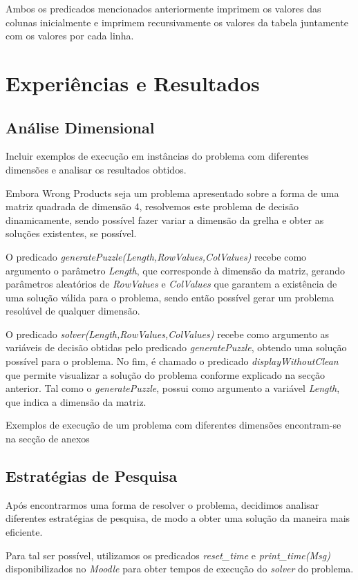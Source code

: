 \documentclass[11pt]{article}
\begin{document}
Ambos os predicados mencionados anteriormente imprimem os valores das colunas inicialmente
e imprimem recursivamente os valores da tabela juntamente com os valores por cada linha.

\section{Experiências e Resultados}

\subsection{Análise Dimensional} Incluir exemplos de execução em instâncias do problema com
diferentes dimensões e analisar os resultados obtidos.

Embora Wrong Products seja um problema apresentado sobre a forma de uma matriz quadrada de dimensão 4, resolvemos este problema de decisão dinamicamente, sendo possível fazer variar a dimensão da grelha e obter as soluções existentes, se possível.

O predicado \emph{generatePuzzle(Length,RowValues,ColValues)} recebe como argumento o parâmetro \emph{Length}, que corresponde à dimensão da matriz, gerando parâmetros aleatórios de \emph{RowValues} e \emph{ColValues} que garantem a existência de uma solução válida para o problema, sendo então possível gerar um problema resolúvel de qualquer dimensão.

O predicado \emph{solver(Length,RowValues,ColValues)} recebe como argumento as variáveis de decisão obtidas pelo predicado \emph{generatePuzzle}, obtendo uma solução possível para o problema. No fim, é chamado o predicado \emph{displayWithoutClean} que permite visualizar a solução do problema conforme explicado na secção anterior. Tal como o \emph{generatePuzzle}, possui como argumento a variável \emph{Length}, que indica a dimensão da matriz.


Exemplos de execução de um problema com diferentes dimensões encontram-se na secção de anexos



\subsection{Estratégias de Pesquisa}

Após encontrarmos uma forma de resolver o problema, decidimos analisar diferentes estratégias de pesquisa, de modo a obter uma solução da maneira mais eficiente.

Para tal ser possível, utilizamos os predicados \emph{reset\_time} e \emph{print\_time(Msg)} disponibilizados no \emph{Moodle} para obter tempos de execução do \emph{solver} do problema.
\end{document}
